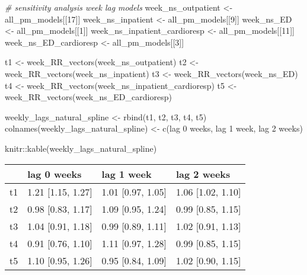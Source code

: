 \documentclass[
]{article}
\newenvironment{Shaded}{\begin{snugshade}}{\end{snugshade}}
\newcommand{\CommentTok}[1]{\textcolor[rgb]{0.56,0.35,0.01}{\textit{#1}}}
\newcommand{\DecValTok}[1]{\textcolor[rgb]{0.00,0.00,0.81}{#1}}
\newcommand{\FunctionTok}[1]{\textcolor[rgb]{0.00,0.00,0.00}{#1}}
\newcommand{\NormalTok}[1]{#1}
\newcommand{\OtherTok}[1]{\textcolor[rgb]{0.56,0.35,0.01}{#1}}
\newcommand{\SpecialCharTok}[1]{\textcolor[rgb]{0.00,0.00,0.00}{#1}}
\newcommand{\StringTok}[1]{\textcolor[rgb]{0.31,0.60,0.02}{#1}}
\begin{document}
\begin{Shaded}
\begin{Highlighting}[]
\CommentTok{\# sensitivity analysis week lag models}
\NormalTok{week\_ns\_outpatient }\OtherTok{\textless{}{-}}\NormalTok{ all\_pm\_models[[}\DecValTok{17}\NormalTok{]]}
\NormalTok{week\_ns\_inpatient }\OtherTok{\textless{}{-}}\NormalTok{ all\_pm\_models[[}\DecValTok{9}\NormalTok{]]}
\NormalTok{week\_ns\_ED }\OtherTok{\textless{}{-}}\NormalTok{ all\_pm\_models[[}\DecValTok{1}\NormalTok{]]}
\NormalTok{week\_ns\_inpatient\_cardioresp }\OtherTok{\textless{}{-}}\NormalTok{ all\_pm\_models[[}\DecValTok{11}\NormalTok{]]}
\NormalTok{week\_ns\_ED\_cardioresp }\OtherTok{\textless{}{-}}\NormalTok{ all\_pm\_models[[}\DecValTok{3}\NormalTok{]]}

\NormalTok{t1 }\OtherTok{\textless{}{-}} \FunctionTok{week\_RR\_vectors}\NormalTok{(week\_ns\_outpatient)}
\NormalTok{t2 }\OtherTok{\textless{}{-}} \FunctionTok{week\_RR\_vectors}\NormalTok{(week\_ns\_inpatient)}
\NormalTok{t3 }\OtherTok{\textless{}{-}} \FunctionTok{week\_RR\_vectors}\NormalTok{(week\_ns\_ED)}
\NormalTok{t4 }\OtherTok{\textless{}{-}} \FunctionTok{week\_RR\_vectors}\NormalTok{(week\_ns\_inpatient\_cardioresp)}
\NormalTok{t5 }\OtherTok{\textless{}{-}} \FunctionTok{week\_RR\_vectors}\NormalTok{(week\_ns\_ED\_cardioresp)}

\NormalTok{weekly\_lags\_natural\_spline }\OtherTok{\textless{}{-}} \FunctionTok{rbind}\NormalTok{(t1, t2, t3, t4, t5)}
\FunctionTok{colnames}\NormalTok{(weekly\_lags\_natural\_spline) }\OtherTok{\textless{}{-}}
  \FunctionTok{c}\NormalTok{(}\StringTok{\textquotesingle{}lag 0 weeks\textquotesingle{}}\NormalTok{, }\StringTok{\textquotesingle{}lag 1 week\textquotesingle{}}\NormalTok{, }\StringTok{\textquotesingle{}lag 2 weeks\textquotesingle{}}\NormalTok{)}

\NormalTok{knitr}\SpecialCharTok{::}\FunctionTok{kable}\NormalTok{(weekly\_lags\_natural\_spline)}
\end{Highlighting}
\end{Shaded}

\begin{longtable}[]{@{}llll@{}}
\toprule()
& lag 0 weeks & lag 1 week & lag 2 weeks \\
\midrule()
\endhead
t1 & 1.21 {[}1.15, 1.27{]} & 1.01 {[}0.97, 1.05{]} & 1.06 {[}1.02,
1.10{]} \\
t2 & 0.98 {[}0.83, 1.17{]} & 1.09 {[}0.95, 1.24{]} & 0.99 {[}0.85,
1.15{]} \\
t3 & 1.04 {[}0.91, 1.18{]} & 0.99 {[}0.89, 1.11{]} & 1.02 {[}0.91,
1.13{]} \\
t4 & 0.91 {[}0.76, 1.10{]} & 1.11 {[}0.97, 1.28{]} & 0.99 {[}0.85,
1.15{]} \\
t5 & 1.10 {[}0.95, 1.26{]} & 0.95 {[}0.84, 1.09{]} & 1.02 {[}0.90,
1.15{]} \\
\bottomrule()
\end{longtable}
\end{document}
